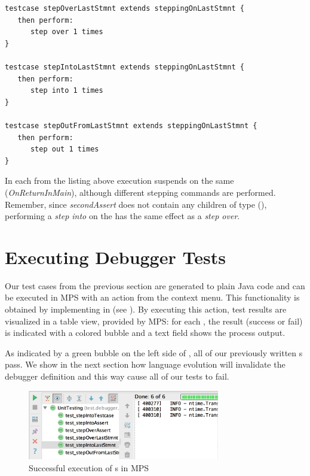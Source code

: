 \begin{lstlisting}[language=testingDSL,
caption=Test stepping commands on last \ic{Statemet} in \ic{Testcase}] 
testcase stepOverLastStmnt extends steppingOnLastStmnt { 
   then perform:                         
      step over 1 times                            
}

testcase stepIntoLastStmnt extends steppingOnLastStmnt {            
   then perform:                         
      step into 1 times                            
}

testcase stepOutFromLastStmnt extends steppingOnLastStmnt {            
   then perform:                         
      step out 1 times                            
}
\end{lstlisting}		

In each  from the listing above execution suspends on the
same  (\emph{OnReturnInMain}), although different stepping
commands are performed. Remember, since \emph{secondAssert} does not contain
any children of type  (\eg {}), performing a
\emph{step into} on the  has the same effect as
a \emph{step over}.

\section{Executing Debugger Tests}

Our test cases from the previous section are generated to plain Java code and
can be executed in \ac{MPS} with an action from the
context menu. This functionality is obtained by implementing  in
 (see ).
By executing this action, test results are visualized in a table view, provided
by \ac{MPS}: for each , the result (success or
fail) is indicated with a colored bubble and a text field shows the
process output.

As indicated by a green bubble on the left side of , all
of our previously written s pass. 
We show in the next section how language evolution will invalidate the debugger
definition and this way cause all of our tests to fail.

\begin{figure}[h]
	\vspace{-2mm}
	\centering
    \includegraphics[width=8.4cm]{./figures/debuggerTestExec.png} 
    \vspace{-3mm}
	\caption{Successful execution of s in \ac{MPS}}
	\label{fig:TestExecution1}
	\vspace{-3mm}
\end{figure}